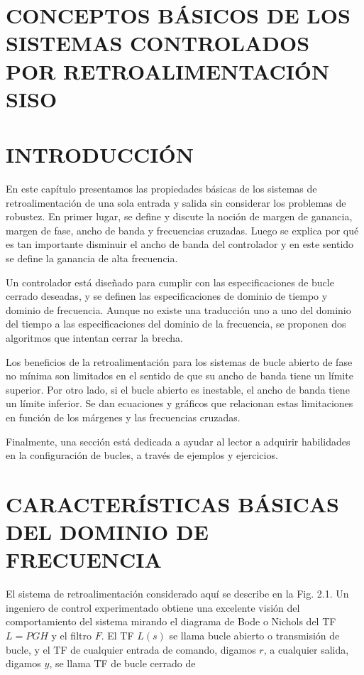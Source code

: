 %
%

\section{CONCEPTOS BÁSICOS DE LOS SISTEMAS CONTROLADOS POR RETROALIMENTACIÓN SISO}
\section{INTRODUCCIÓN}
En este capítulo presentamos las propiedades básicas de los sistemas de retroalimentación de una sola entrada y salida sin considerar los problemas de robustez. En primer lugar, se define y discute la noción de margen de ganancia, margen de fase, ancho de banda y frecuencias cruzadas. Luego se explica por qué es tan importante disminuir el ancho de banda del controlador y en este sentido se define la ganancia de alta frecuencia.

Un controlador está diseñado para cumplir con las especificaciones de bucle cerrado deseadas, y se definen las especificaciones de dominio de tiempo y dominio de frecuencia. Aunque no existe una traducción uno a uno del dominio del tiempo a las especificaciones del dominio de la frecuencia, se proponen dos algoritmos que intentan cerrar la brecha.

Los beneficios de la retroalimentación para los sistemas de bucle abierto de fase no mínima son limitados en el sentido de que su ancho de banda tiene un límite superior. Por otro lado, si el bucle abierto es inestable, el ancho de banda tiene un límite inferior. Se dan ecuaciones y gráficos que relacionan estas limitaciones en función de los márgenes y las frecuencias cruzadas.

Finalmente, una sección está dedicada a ayudar al lector a adquirir habilidades en la configuración de bucles, a través de ejemplos y ejercicios.

\section{CARACTERÍSTICAS BÁSICAS DEL DOMINIO DE FRECUENCIA}
El sistema de retroalimentación considerado aquí se describe en la Fig. 2.1. Un ingeniero de control experimentado obtiene una excelente visión del comportamiento del sistema mirando el diagrama de Bode o Nichols del TF $L = P G H$ y el filtro $F$. El TF $L(s)$ se llama bucle abierto o transmisión de bucle, y el TF de cualquier entrada de comando, digamos $r$, a cualquier salida, digamos $y$, se llama TF de bucle cerrado de

